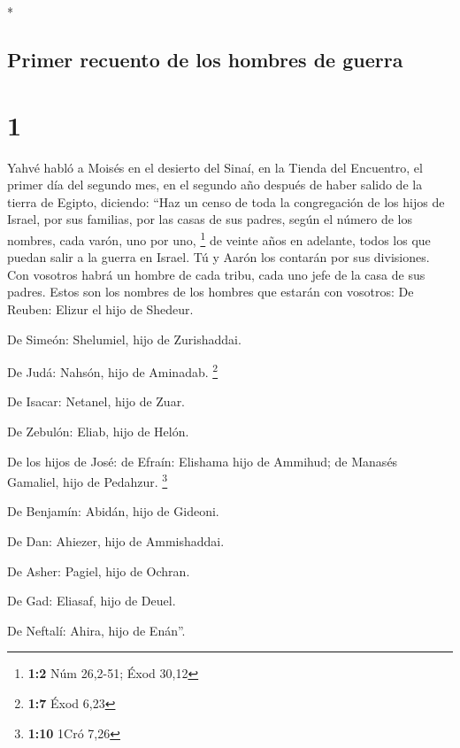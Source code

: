 \begin{paracol}{2} \switchcolumn[0]*

\hypertarget{primer-recuento-de-los-hombres-de-guerra}{%
\subsection{Primer recuento de los hombres de
guerra}\label{primer-recuento-de-los-hombres-de-guerra}}

\hypertarget{section}{%
\section{1}\label{section}}

 Yahvé habló a Moisés en el desierto del Sinaí, en la
Tienda del Encuentro, el primer día del segundo mes, en el segundo año
después de haber salido de la tierra de Egipto, diciendo: 
``Haz un censo de toda la congregación de los hijos de Israel, por sus
familias, por las casas de sus padres, según el número de los nombres,
cada varón, uno por uno, \footnote{\textbf{1:2} Núm 26,2-51; Éxod 30,12}
 de veinte años en adelante, todos los que puedan salir a
la guerra en Israel. Tú y Aarón los contarán por sus divisiones.
 Con vosotros habrá un hombre de cada tribu, cada uno jefe
de la casa de sus padres.  Estos son los nombres de los
hombres que estarán con vosotros: De Reuben: Elizur el hijo de Shedeur.

 De Simeón: Shelumiel, hijo de Zurishaddai.

 De Judá: Nahsón, hijo de Aminadab. \footnote{\textbf{1:7}
  Éxod 6,23}

 De Isacar: Netanel, hijo de Zuar.

 De Zebulón: Eliab, hijo de Helón.

 De los hijos de José: de Efraín: Elishama hijo de
Ammihud; de Manasés Gamaliel, hijo de Pedahzur. \footnote{\textbf{1:10}
  1Cró 7,26}

 De Benjamín: Abidán, hijo de Gideoni.

 De Dan: Ahiezer, hijo de Ammishaddai.

 De Asher: Pagiel, hijo de Ochran.

 De Gad: Eliasaf, hijo de Deuel.

 De Neftalí: Ahira, hijo de Enán''.


\end{paracol}
